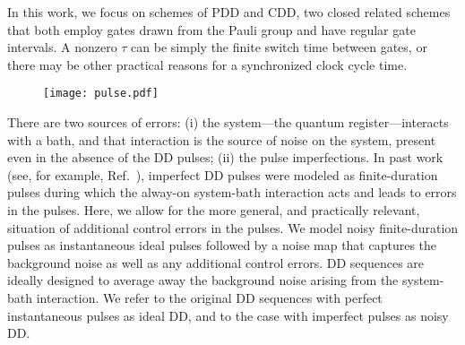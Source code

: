 \documentclass[pra,reprint,superscriptaddress]{revtex4-2}
\begin{document}
In this work, we focus on schemes of PDD and CDD, 
two closed related schemes that both employ gates drawn from the Pauli group
and have regular gate intervals. 
A nonzero $\tau$ can be simply the finite switch time between gates, or there may be other practical reasons for a synchronized clock cycle time. 
\begin{figure}[htbp]
 \texttt{[image: pulse.pdf]}
 \caption{ }
 \label{fig:pulses}
\end{figure}

There are two sources of errors: (i) the system---the quantum register---interacts with a bath, and that interaction is the source of noise on the system, present even in the absence of the DD pulses; (ii) the pulse imperfections. In past work (see, for example, Ref.~\cite{khodjasteh2005fault}), imperfect DD pulses were modeled as finite-duration pulses during which the alway-on system-bath interaction acts and leads to errors in the pulses. Here, we allow for the more general, and practically relevant, situation of additional control errors in the pulses. We model noisy finite-duration pulses as instantaneous ideal pulses followed by a noise map that captures the background noise as well as any additional control errors. DD sequences are ideally designed to average away the background noise arising from the system-bath interaction. We refer to the original DD sequences with perfect instantaneous pulses as ideal DD, and to the case with imperfect pulses as noisy DD.
\end{document}
